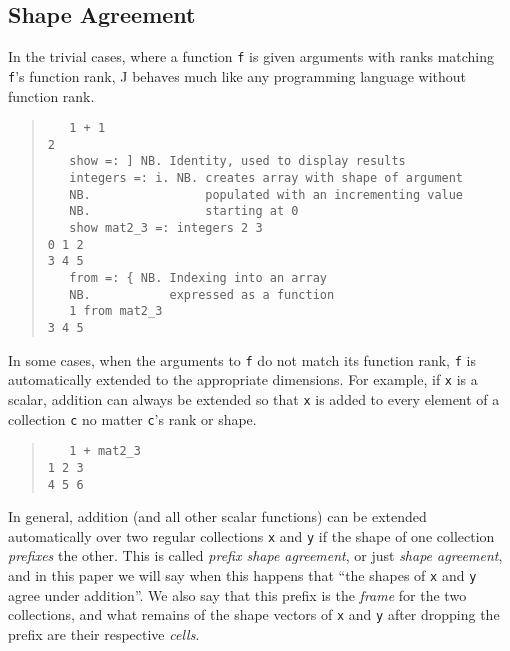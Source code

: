 \subsection{Shape Agreement}
In the trivial cases, where a function \texttt{f} is given arguments with ranks matching \texttt{f}'s function rank, 
J behaves much like any programming language without function rank. 

\begin{quote}
\begin{singlespacing}
\begin{small}
\begin{verbatim}
   1 + 1
2
   show =: ] NB. Identity, used to display results
   integers =: i. NB. creates array with shape of argument
   NB.                populated with an incrementing value
   NB.                starting at 0
   show mat2_3 =: integers 2 3
0 1 2
3 4 5
   from =: { NB. Indexing into an array
   NB.           expressed as a function
   1 from mat2_3
3 4 5
\end{verbatim}
\end{small}
\end{singlespacing}
\end{quote}

\noindent In some cases, when the arguments to \texttt{f} do not match its function rank, 
\texttt{f} is automatically extended to the appropriate dimensions.
For example, if \texttt{x} is a scalar, addition can always be extended so that \texttt{x} is added to every element of a collection \texttt{c} 
no matter \texttt{c}'s rank or shape. 

\begin{quote}
\begin{singlespacing}
\begin{small}
\begin{verbatim}
   1 + mat2_3
1 2 3
4 5 6
\end{verbatim}
\end{small}
\end{singlespacing}
\end{quote}

In general, addition (and all other scalar functions) can be extended automatically over two regular collections \texttt{x} and \texttt{y}  
if the shape of one collection \textit{prefixes} the other.
This is called \textit{prefix shape agreement}, or just \textit{shape agreement}, 
and in this paper we will say when this happens that ``the shapes of \texttt{x} and \texttt{y} agree under addition''\cite{rankanduni}.
We also say that this prefix is the \textit{frame} for the two collections,
and what remains of the shape vectors of \texttt{x} and \texttt{y} after dropping the prefix are their respective \textit{cells}.

